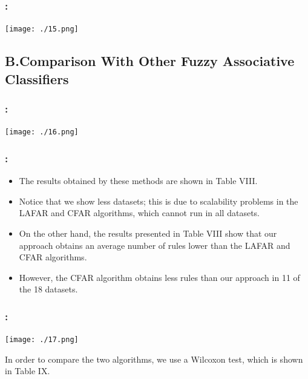 \documentclass{beamer}
\begin{document}
\begin{CJK*}{UTF8}{bsmi}
\begin{frame}
	\frametitle{\insertsection : \insertsubsection}
	\begin{center}
		\texttt{[image: ./15.png]}
	\end{center}
\end{frame}


\subsection{B.Comparison With Other Fuzzy Associative Classifiers}


\begin{frame}
	\frametitle{\insertsection : \insertsubsection}
	\begin{center}
		\texttt{[image: ./16.png]}
	\end{center}
\end{frame}


\begin{frame}
	\frametitle{\insertsection : \insertsubsection}
	\begin{itemize}
		\item The results obtained by these methods are shown in Table VIII. 
		\item Notice that we show less datasets; this is due to scalability problems in the LAFAR and CFAR algorithms, which cannot run in all datasets.
		\item On the other hand, the results presented in Table VIII show that our approach obtains an average number of rules lower than the LAFAR and CFAR algorithms.
		\item However, the CFAR algorithm obtains less rules than our approach in 11 of the 18 datasets.
	\end{itemize}
\end{frame}


\begin{frame}
	\frametitle{\insertsection : \insertsubsection}
	\begin{center}
		\texttt{[image: ./17.png]}
	\end{center}
	In order to compare the two algorithms, we use a Wilcoxon test, which is shown in Table IX.
\end{frame}


\end{CJK*}
\end{document}
